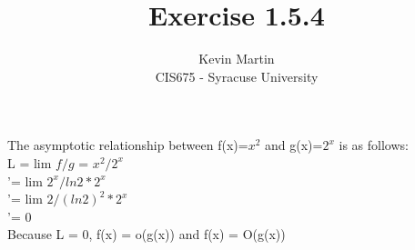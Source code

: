 \documentclass{article}
\author{Kevin Martin\\ CIS675 - Syracuse University}
\title{Exercise 1.5.4}
\begin{document}
\maketitle

The asymptotic relationship between f(x)=\(x^2\) and g(x)=\(2^x\) is as follows:\\
L = lim \(f/g\) = \(x^2/2^x\)\\
 '= lim \(2^x/ln2*2^x\)\\
 '= lim \(2/(ln2)^2*2^x\)\\
 '= 0\\
 Because L = 0, f(x) = o(g(x)) and f(x) = O(g(x))
\end{document}
